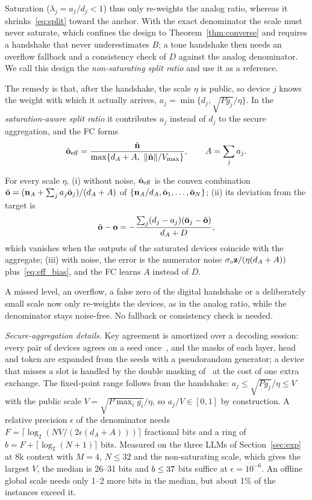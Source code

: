 Saturation ($\lambda_j=a_j/d_j<1$) thus only re-weights the analog ratio, whereas it shrinks~\eqref{eq:split} toward the anchor. With the exact denominator the scale must never saturate, which confines the design to Theorem~\ref{thm:converse} and requires a handshake that never underestimates $B$; a tone handshake then needs an overflow fallback and a consistency check of $D$ against the analog denominator. We call this design the \emph{non-saturating split ratio} and use it as a reference.

The remedy is that, after the handshake, the scale $\eta$ is public, so device $j$ knows the weight with which it actually arrives, $a_j=\min\{d_j,\sqrt{Pg_j}/\eta\}$. In the \emph{saturation-aware split ratio} it contributes $a_j$ instead of $d_j$ to the secure aggregation, and the FC forms
\begin{equation}
\hat\vo_{\rm eff}=\frac{\hat\vn}{\max\{d_A+A,\ \|\hat\vn\|/V_{\max}\}},\qquad A=\sum_ja_j.
\label{eq:split_eff}
\end{equation}

\begin{proposition}\label{prop:eff}
For every scale $\eta$, (i) without noise, $\hat{\mathbf{o}}_{\rm eff}$ is the convex combination $\tilde{\mathbf{o}}=(\mathbf{n}_A+\sum_ja_j\bar{\mathbf{o}}_j)/(d_A+A)$ of $\{\mathbf{n}_A/d_A,\bar{\mathbf{o}}_1,\dots,\bar{\mathbf{o}}_N\}$; (ii) its deviation from the target is
\begin{equation}
\tilde{\mathbf{o}}-\mathbf{o}=-\frac{\sum_j(d_j-a_j)(\bar{\mathbf{o}}_j-\tilde{\mathbf{o}})}{d_A+D},
\label{eq:eff_bias}
\end{equation}
which vanishes when the outputs of the saturated devices coincide with the aggregate; (iii) with noise, the error is the numerator noise $\sigma_o\mathbf{z}/(\eta(d_A+A))$ plus~\eqref{eq:eff_bias}, and the FC learns $A$ instead of $D$.
\end{proposition}

A missed level, an overflow, a false zero of the digital handshake or a deliberately small scale now only re-weights the devices, as in the analog ratio, while the denominator stays noise-free. No fallback or consistency check is needed.

\emph{Secure-aggregation details.} Key agreement is amortized over a decoding session: every pair of devices agrees on a seed once~\cite{bonawitz2017secagg}, and the masks of each layer, head and token are expanded from the seeds with a pseudorandom generator; a device that misses a slot is handled by the double masking of~\cite{bonawitz2017secagg} at the cost of one extra exchange. The fixed-point range follows from the handshake: $a_j\le\sqrt{Pg_j}/\eta\le V$ with the public scale $V=\sqrt{P\max_ig_i}/\eta$, so $a_j/V\in[0,1]$ by construction. A relative precision $\epsilon$ of the denominator needs $F=\lceil\log_2(NV/(2\epsilon(d_A+A)))\rceil$ fractional bits and a ring of $b=F+\lceil\log_2(N+1)\rceil$ bits. Measured on the three LLMs of Section~\ref{sec:exp} at 8k context with $M=4$, $N\le32$ and the non-saturating scale, which gives the largest $V$, the median is 26--31 bits and $b\le37$ bits suffice at $\epsilon=10^{-6}$. An offline global scale needs only 1--2 more bits in the median, but about 1\% of the instances exceed it.


